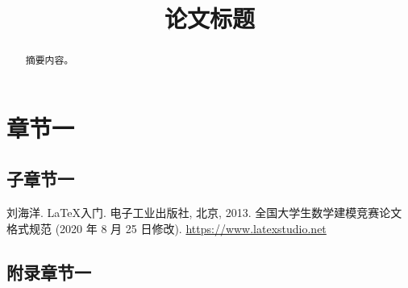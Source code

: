 \documentclass{cumcmthesis}
\title{论文标题}
\begin{document}
    \maketitle

    \begin{abstract}
        摘要内容。

    \end{abstract}

    \section{章节一}
        \subsection{子章节一}

    \begin{thebibliography}{9}
        刘海洋.
        \newblock \LaTeX {}入门\allowbreak[J].
        \newblock 电子工业出版社, 北京, 2013.
        全国大学生数学建模竞赛论文格式规范 (2020 年 8 月 25 日修改).
        \url{https://www.latexstudio.net}
    \end{thebibliography}

    \newpage

    \begin{appendices}
        \section{附录章节一}
    \end{appendices}
\end{document}
